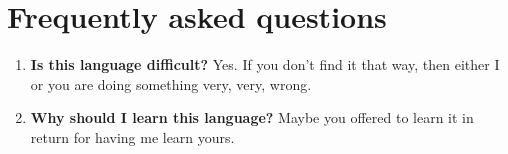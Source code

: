 \chapter{Frequently asked questions}

\newcommand{\qa}[2]{\item \textbf{#1} #2 \\}

\begin{enumerate}
  \qa{Is this language difficult?}{Yes. If you don't find it that way, then either I or you are doing something very, very, wrong.}
  \qa{Why should I learn this language?}{Maybe you offered to learn it in return for having me learn yours.}
\end{enumerate}
